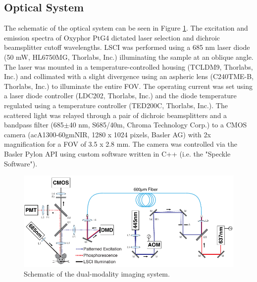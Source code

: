 \subsection{Optical System}

The schematic of the optical system can be seen in Figure \ref{fig:systemschematic_1}. The excitation and emission spectra of Oxyphor PtG4 dictated laser selection and dichroic beamsplitter cutoff wavelengths. LSCI was performed using a 685 nm laser diode (50 mW, HL6750MG, Thorlabs, Inc.) illuminating the sample at an oblique angle. The laser was mounted in a temperature-controlled housing (TCLDM9, Thorlabs, Inc.) and collimated with a slight divergence using an aspheric lens (C240TME-B, Thorlabs, Inc.) to illuminate the entire FOV. The operating current was set using a laser diode controller (LDC202, Thorlabs, Inc.) and the diode temperature regulated using a temperature controller (TED200C, Thorlabs, Inc.). The scattered light was relayed through a pair of dichroic beamsplitters and a bandpass filter (685$\pm$40 nm, S685/40m, Chroma Technology Corp.) to a CMOS camera (acA1300-60gmNIR, 1280 x 1024 pixels, Basler AG) with 2x magnification for a FOV of 3.5 x 2.8 mm. The camera was controlled via the Basler Pylon API using custom software written in C++ (i.e. the "Speckle Software").

\begin{figure}
    \includegraphics{figures/chapter_2/systemschematic.pdf}
    \caption {
        \label{fig:systemschematic_1}
        Schematic of the dual-modality imaging system.
    }
\end{figure}

